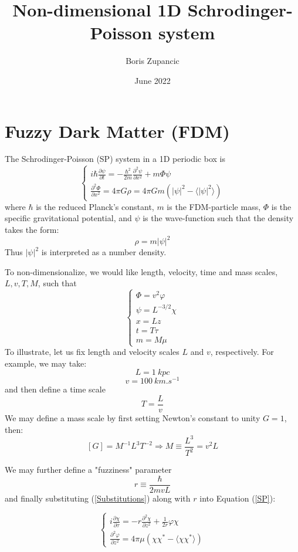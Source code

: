 \documentclass{article}
\title{Non-dimensional 1D Schrodinger-Poisson system}
\author{Boris Zupancic}
\date{June 2022}
\newcommand{\pd}{\partial}
\begin{document}
\maketitle

\section{Fuzzy Dark Matter (FDM)}
The Schrodinger-Poisson (SP) system in a 1D periodic box is
\begin{equation}
    \begin{cases}
    i\hbar \frac{\pd \psi}{\pd t} = -\frac{\hbar^2}{2m}\frac{\pd^2 \psi}{\pd x^2} + m\Phi \psi 
    \\
    \frac{\pd^2 \Phi}{\pd x^2} = 4\pi G \rho= 4\pi G m (|\psi|^2 - \langle |\psi|^2 \rangle)
    \end{cases}
    \label{SP}
\end{equation}
where $\hbar$ is the reduced Planck's constant, $m$ is the FDM-particle mass, $\Phi$ is the specific gravitational potential, and $\psi$ is the wave-function such that the density takes the form:
$$\rho = m|\psi|^2$$
Thus $|\psi|^2$ is interpreted as a number density.

To non-dimensionalize, we would like length, velocity, time and mass scales, $L, v,T,M$, such that
\begin{equation}
    \begin{cases}
    \Phi = v^2 \varphi\\
    \psi = L^{-3/2} \chi\\
    x = L z\\
    t = T \tau\\
    m = M \mu
    \end{cases}
    \label{Substitutions}
\end{equation}
To illustrate, let us fix length and velocity scales $L$ and $v$, respectively. For example, we may take:
$$L = \SI{1}{kpc} $$
$$v = \SI{100}{km.s^{-1}}$$
and then define a time scale 
$$T  = \frac{L}{v}$$
We may define a mass scale by first setting Newton's constant to unity $G = 1$, then:
$$[G] = M^{-1} L^3 T^{-2} \Rightarrow M \equiv \frac{L^3}{T^2} = v^2 L$$

We may further define a "fuzziness" parameter 
$$r \equiv \frac{\hbar}{2 m v L}$$
and finally substituting (\ref{Substitutions}) along with $r$ into Equation (\ref{SP}):

\begin{equation}
    \begin{cases}
    i\frac{\pd \chi}{\pd \tau} = -r\frac{\pd^2 \chi}{\pd z^2} + \frac{1}{2r}\varphi\chi \\
    
    \frac{\pd^2 \varphi}{\pd z^2} = 4\pi\mu (\chi\chi^* - \langle\chi\chi^*\rangle)
    \end{cases}
    \label{SP-NonDim}
\end{equation}
\end{document}
